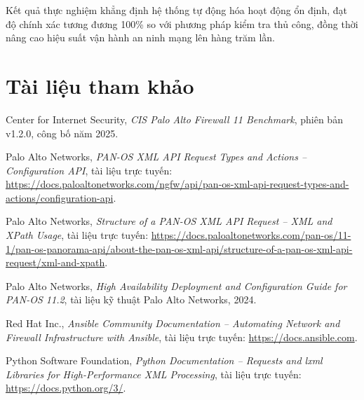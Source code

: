 \documentclass[12pt,a4paper]{article}
\begin{document}
Kết quả thực nghiệm khẳng định hệ thống tự động hóa hoạt động ổn định, đạt độ chính xác tương đương 100\% so với phương pháp kiểm tra thủ công, đồng thời nâng cao hiệu suất vận hành an ninh mạng lên hàng trăm lần.

\clearpage
\section*{Tài liệu tham khảo}

\begin{enumerate}[label={[\arabic*]}]
    \item Center for Internet Security, \textit{CIS Palo Alto Firewall 11 Benchmark}, phiên bản v1.2.0, công bố năm 2025.
    \item Palo Alto Networks, \textit{PAN-OS XML API Request Types and Actions -- Configuration API}, tài liệu trực tuyến: \url{https://docs.paloaltonetworks.com/ngfw/api/pan-os-xml-api-request-types-and-actions/configuration-api}.
    \item Palo Alto Networks, \textit{Structure of a PAN-OS XML API Request -- XML and XPath Usage}, tài liệu trực tuyến: \url{https://docs.paloaltonetworks.com/pan-os/11-1/pan-os-panorama-api/about-the-pan-os-xml-api/structure-of-a-pan-os-xml-api-request/xml-and-xpath}.
    \item Palo Alto Networks, \textit{High Availability Deployment and Configuration Guide for PAN-OS 11.2}, tài liệu kỹ thuật Palo Alto Networks, 2024.
    \item Red Hat Inc., \textit{Ansible Community Documentation -- Automating Network and Firewall Infrastructure with Ansible}, tài liệu trực tuyến: \url{https://docs.ansible.com}.
    \item Python Software Foundation, \textit{Python Documentation -- Requests and lxml Libraries for High-Performance XML Processing}, tài liệu trực tuyến: \url{https://docs.python.org/3/}.
\end{enumerate}
\end{document}
